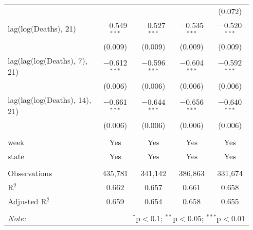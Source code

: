 \begin{tabular}{@{\extracolsep{1pt}}lcccc}
  &  &  &  & (0.072) \\ 
  lag(log(Deaths), 21) & $-$0.549$^{***}$ & $-$0.527$^{***}$ & $-$0.535$^{***}$ & $-$0.520$^{***}$ \\ 
  & (0.009) & (0.009) & (0.009) & (0.009) \\ 
  lag(lag(log(Deaths), 7), 21) & $-$0.612$^{***}$ & $-$0.596$^{***}$ & $-$0.604$^{***}$ & $-$0.592$^{***}$ \\ 
  & (0.006) & (0.006) & (0.006) & (0.006) \\ 
  lag(lag(log(Deaths), 14), 21) & $-$0.661$^{***}$ & $-$0.644$^{***}$ & $-$0.656$^{***}$ & $-$0.640$^{***}$ \\ 
  & (0.006) & (0.006) & (0.006) & (0.006) \\ 
 \hline \\[-1.8ex] 
week & Yes & Yes & Yes & Yes \\ 
state & Yes & Yes & Yes & Yes \\ 
\hline \\[-1.8ex] 
Observations & 435,781 & 341,142 & 386,863 & 331,674 \\ 
R$^{2}$ & 0.662 & 0.657 & 0.661 & 0.658 \\ 
Adjusted R$^{2}$ & 0.659 & 0.654 & 0.658 & 0.655 \\ 
\hline 
\hline \\[-1.8ex] 
\textit{Note:}  & \multicolumn{4}{r}{$^{*}$p$<$0.1; $^{**}$p$<$0.05; $^{***}$p$<$0.01} \\ 
\end{tabular} 